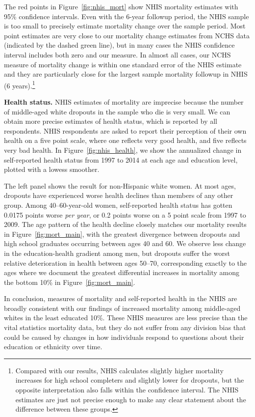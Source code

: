 The red points in Figure~\ref{fig:nhis_mort} show NHIS mortality estimates with 95\%
confidence intervals. Even with the 6-year followup period, the NHIS
sample is too small to precisely estimate mortality change over the
sample period. Most point estimates are very close to our mortality
change estimates from NCHS data (indicated by the dashed green line),
but in many cases the NHIS confidence interval includes both zero and
our measure. In almost all cases, our NCHS measure of mortality change
is within one standard error of the NHIS estimate and they are particularly close for the largest sample mortality followup in NHIS (6 years).\footnote{Compared with our
  results, NHIS calculates slightly higher mortality increases for high school completers and slightly lower for dropouts, but the opposite interpretation also falls within the confidence interval. The NHIS estimates are just not precise enough to make any clear statement about the difference between these groups.}

\textbf{Health status.} NHIS estimates of mortality are imprecise because the number of
middle-aged white dropouts in the sample who die is very small. We can
obtain more precise estimates of health status, which is reported by
all respondents. NHIS respondents are asked to report their perception
of their own health on a five point scale, where one reflects very
good health, and five reflects very bad health. In
Figure~\ref{fig:nhis_health}, we show the annualized change
in self-reported health status from 1997 to 2014 at each age and
education level, plotted with a lowess smoother.

The left panel shows the result for non-Hispanic white women. At most
ages, dropouts have experienced worse health declines than members of
any other group. Among 40--60-year-old women, self-reported health
status has gotten 0.0175 points worse \textit{per year}, or 0.2 points
worse on a 5 point scale from 1997 to 2009. The age pattern of the
health decline closely matches our mortality results in
Figure~\ref{fig:mort_main}, with the greatest divergence between
dropouts and high school graduates occurring between ages 40 and
60. We observe less change in the education-health gradient among men,
but dropouts suffer the worst relative deterioration in health between ages
50--70, corresponding exactly to the ages where we document the
greatest differential increases in mortality among the bottom 10\% in
Figure~\ref{fig:mort_main}.

In conclusion, measures of mortality and self-reported health in the
NHIS are broadly consistent with our findings of increased
mortality among middle-aged whites in the least educated
10\%. These NHIS measures are less precise than the vital statistics
mortality data, but they do not suffer from any division bias that
could be caused by changes in how individuals respond to questions
about their education or ethnicity over time.

